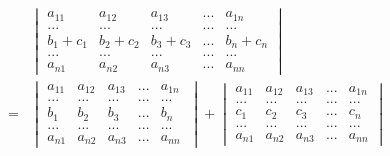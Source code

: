 \documentclass[blue,normal,cn]{elegantnote}
\begin{document}
\begin{property}
    $$
        \begin{aligned}
            &
            \begin{vmatrix} 
                a_{11}&a_{12} & a_{13} &...& a_{1n}\\
                ...&...&...&...&...\\
                b_1+c_1&b_2+c_2 & b_3+c_3 &...& b_n+c_n\\
                ...&...&...&...&...\\
                a_{n1}&a_{n2} & a_{n3} &...& a_{nn}
            \end{vmatrix}
        \\=&
        \begin{vmatrix} 
            a_{11}&a_{12} & a_{13} &...& a_{1n}\\
            ...&...&...&...&...\\
            b_1&b_2 & b_3 &...& b_n\\
            ...&...&...&...&...\\
            a_{n1}&a_{n2} & a_{n3} &...& a_{nn}\
            \end{vmatrix}
            +
            \begin{vmatrix} 
                a_{11}&a_{12} & a_{13} &...& a_{1n}\\
                ...&...&...&...&...\\
                c_1&c_2 & c_3 &...& c_n\\
                ...&...&...&...&...\\
                a_{n1}&a_{n2} & a_{n3} &...& a_{nn}
            \end{vmatrix}
        \end{aligned}
    $$
    \end{property}
\end{document}
